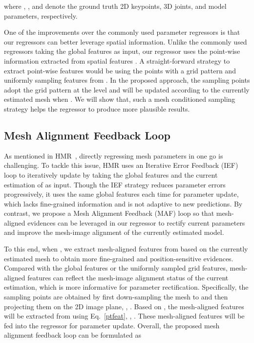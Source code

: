 \documentclass[10pt,twocolumn,letterpaper]{article}
\begin{document}
where , , and  denote the ground truth 2D keypoints, 3D joints, and model parameters, respectively.


One of the improvements over the commonly used parameter regressors is that our regressors can better leverage spatial information.
Unlike the commonly used regressors taking the global features  as input, our regressor uses the point-wise information extracted from spatial features .
A straight-forward strategy to extract point-wise features would be using the points  with a grid pattern and uniformly sampling features from .
In the proposed approach, the sampling points  adopt the grid pattern at the level  and will be updated according to the currently estimated mesh when .
We will show that, such a mesh conditioned sampling strategy helps the regressor to produce more plausible results.


\subsection{Mesh Alignment Feedback Loop}

As mentioned in HMR~\cite{kanazawa2018end}, directly regressing mesh parameters in one go is challenging.
To tackle this issue, HMR uses an Iterative Error Feedback (IEF) loop to iteratively update  by taking the global features  and the current estimation of  as input.
Though the IEF strategy reduces parameter errors progressively, it uses the same global features each time for parameter update, which lacks fine-grained information and is not adaptive to new predictions.
By contrast, we propose a Mesh Alignment Feedback (MAF) loop so that mesh-aligned evidences can be leveraged in our regressor to rectify current parameters and improve the mesh-image alignment of the currently estimated model.

To this end, when , we extract mesh-aligned features from  based on the currently estimated mesh  to obtain more fine-grained and position-sensitive evidences.
Compared with the global features or the uniformly sampled grid features, mesh-aligned features can reflect the mesh-image alignment status of the current estimation, which is more informative for parameter rectification.
Specifically, the sampling points  are obtained by first down-sampling the mesh  to  and then projecting them on the 2D image plane, \ie, .
Based on , the mesh-aligned features  will be extracted from  using Eq.~\ref{ptfeat}, \ie, .
These mesh-aligned features will be fed into the regressor  for parameter update.
Overall, the proposed mesh alignment feedback loop can be formulated as
\end{document}
